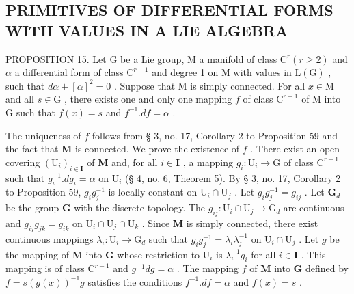 \subsection{PRIMITIVES OF DIFFERENTIAL FORMS WITH VALUES IN A LIE ALGEBRA}

PROPOSITION 15. Let \(\mathrm{G}\) be a Lie group, \(\mathrm{M}\) a manifold of class \(\mathrm{C}^r (r\geqslant 2)\) and \(\alpha\) a differential form of class \(\mathrm{C}^{r - 1}\) and degree 1 on \(\mathrm{M}\) with values in \(\mathrm{L}(\mathrm{G})\) , such that \(d\alpha +[\alpha ]^2 = 0\) . Suppose that \(\mathrm{M}\) is simply connected. For all \(x\in \mathrm{M}\) and all \(s\in \mathrm{G}\) , there exists one and only one mapping \(f\) of class \(\mathrm{C}^{r - 1}\) of \(\mathrm{M}\) into \(\mathrm{G}\) such that \(f(x) = s\) and \(f^{-1}.df = \alpha\) .

The uniqueness of \(f\) follows from § 3, no. 17, Corollary 2 to Proposition 59 and the fact that \(\mathbf{M}\) is connected. We prove the existence of \(f\) . There exist an open covering \((\mathrm{U}_i)_{i\in \mathbf{I}}\) of \(\mathbf{M}\) and, for all \(i\in \mathbf{I}\) , a mapping \(g_i: \mathrm{U}_i\to \mathrm{G}\) of class \(\mathrm{C}^{r - 1}\) such that \(g_i^{-1}.d g_i = \alpha\) on \(\mathrm{U}_i\) (§ 4, no. 6, Theorem 5). By § 3, no. 17, Corollary 2 to Proposition 59, \(g_i g_j^{-1}\) is locally constant on \(\mathrm{U}_i\cap \mathrm{U}_j\) . Let \(g_i g_j^{-1} = g_{ij}\) . Let \(\mathbf{G}_d\) be the group \(\mathbf{G}\) with the discrete topology. The \(g_{ij}: \mathrm{U}_i\cap \mathrm{U}_j\to \mathrm{G}_d\) are continuous and \(g_{ij}g_{jk} = g_{ik}\) on \(\mathrm{U}_i\cap \mathrm{U}_j\cap \mathrm{U}_k\) . Since \(\mathbf{M}\) is simply connected, there exist continuous mappings \(\lambda_i: \mathrm{U}_i\to \mathrm{G}_d\) such that \(g_i g_j^{-1} = \lambda_i\lambda_j^{-1}\) on \(\mathrm{U}_i\cap \mathrm{U}_j\) . Let \(g\) be the mapping of \(\mathbf{M}\) into \(\mathbf{G}\) whose restriction to \(\mathrm{U}_i\) is \(\lambda_i^{-1}g_i\) for all \(i\in \mathbf{I}\) . This mapping is of class \(\mathrm{C}^{r - 1}\) and \(g^{-1}d g = \alpha\) . The mapping \(f\) of \(\mathbf{M}\) into \(\mathbf{G}\) defined by \(f = s(g(x))^{-1}g\) satisfies the conditions \(f^{-1}.df = \alpha\) and \(f(x) = s\) .

